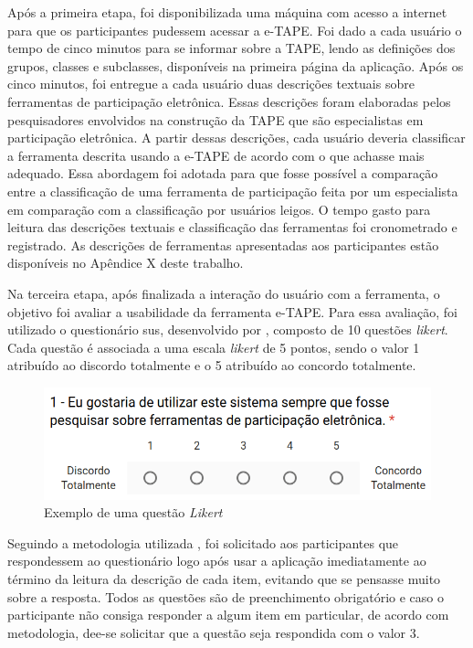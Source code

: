 \par
Após a primeira etapa, foi disponibilizada uma máquina com acesso a internet para que os participantes pudessem acessar a e-TAPE. Foi dado a cada usuário o tempo de cinco minutos para se informar sobre a TAPE, lendo as definições dos grupos, classes e subclasses,
disponíveis na primeira página da aplicação. 
Após os cinco minutos, foi entregue a cada usuário duas descrições textuais sobre ferramentas de participação eletrônica. Essas descrições foram elaboradas pelos pesquisadores envolvidos na construção da TAPE que são especialistas em participação eletrônica. 
A partir dessas descrições, cada usuário deveria classificar a ferramenta descrita usando a e-TAPE de acordo com o que achasse mais adequado.
Essa abordagem foi adotada para que fosse possível a comparação entre a classificação de uma ferramenta de participação feita por um especialista em comparação com a classificação por usuários leigos. O tempo gasto para leitura das descrições textuais e classificação das ferramentas foi cronometrado e registrado.
As descrições de ferramentas apresentadas aos participantes estão disponíveis no Apêndice X deste trabalho.

\par
Na terceira etapa, após finalizada a interação do usuário com a ferramenta, o objetivo foi avaliar a usabilidade da ferramenta e-TAPE.
Para essa avaliação, foi utilizado o questionário \acrfull{sus}, desenvolvido por , composto de 10 questões \textit{likert}. 
Cada questão é associada a uma escala \textit{likert} de 5 pontos, sendo o valor 1 atribuído ao discordo totalmente e o  5 atribuído ao concordo totalmente.

\begin{figure}[!ht]
    \centering
    \includegraphics[scale=0.5]{./figuras/exemplo_pergunta.png}
    \caption{Exemplo de uma questão \textit{Likert}}
    \label{fig:exemplo-pergunta}
\end{figure}

\par
Seguindo a metodologia utilizada , foi solicitado aos participantes que respondessem ao questionário logo após usar a aplicação imediatamente ao término da leitura da descrição de cada item, evitando que se pensasse muito sobre a resposta. 
Todos as questões são de preenchimento obrigatório e caso o participante não consiga responder a algum item em particular, de acordo com metodologia, dee-se solicitar que a questão seja respondida com o valor 3.  


